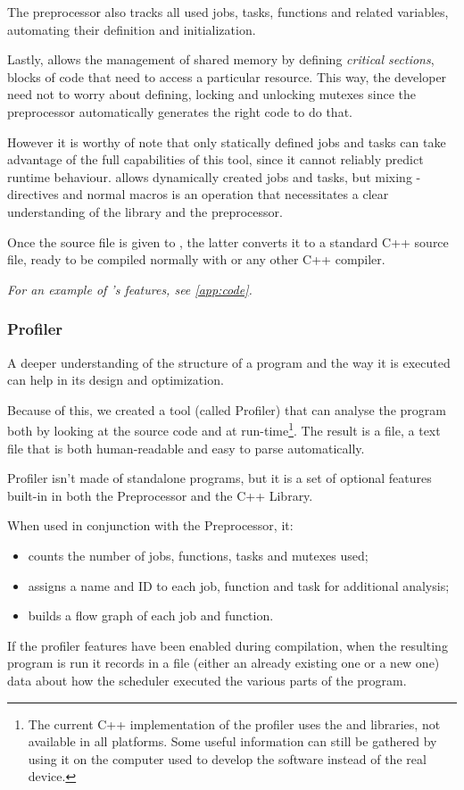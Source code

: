   The preprocessor also tracks all used jobs, tasks, functions and
  related variables, automating their definition and initialization.
  
  Lastly,  allows the management of shared memory
  by defining \textit{critical sections}, blocks of code that need
  to access a particular resource. This way, the developer need not
  to worry about defining, locking and unlocking mutexes since the
  preprocessor automatically generates the right code to do that.
  
  However it is worthy of note that only statically defined jobs and
  tasks can take advantage of the full capabilities of this tool,
  since it cannot reliably predict runtime behaviour. \ScheMo{} allows
  dynamically created jobs and tasks, but mixing
  -directives and normal macros is an operation that
  necessitates a clear understanding of the library and the
  preprocessor.
  
  Once the source file is given to , the latter
  converts it to a standard C++ source file, ready to be compiled
  normally with  or any other C++ compiler.
  
  \textit{For an example of \ScheMo{}'s features, see \autoref{app:code}.}
  
\subsubsection{\ScheMo{} Profiler}
\label{sssec:schemoprofile}
  A deeper understanding of the structure of a \ScheMo{} program and the
  way it is executed can help in its design and optimization.

  Because of this, we created a tool (called \ScheMo{} Profiler) that can
  analyse the program both by looking at the source code and at
  run-time\footnote{The current C++ implementation of the profiler uses
  the  and  libraries, not available in all
  platforms. Some useful information can still be gathered by using it
  on the computer used to develop the software instead of the real
  device.}. The result is a  file, a text file that is
  both human-readable and easy to parse automatically.

  \ScheMo{} Profiler isn't made of standalone programs, but it is
  a set of optional features built-in in both the \ScheMo{} Preprocessor
  and the \ScheMo{} C++ Library.
  
  \beforelist When used in conjunction with the \ScheMo{} Preprocessor, it:
  \begin{itemize}
    \item counts the number of jobs, functions, tasks and mutexes used;
    \item assigns a name and ID to each job, function and task for
      additional analysis;
    \item builds a flow graph of each job and function.
  \end{itemize}
  \afterlist*
  If the profiler features have been enabled during compilation, when
  the resulting program is run it records in a  file
  (either an already existing one or a new one) data about how
  the scheduler executed the various parts of the program.
  

